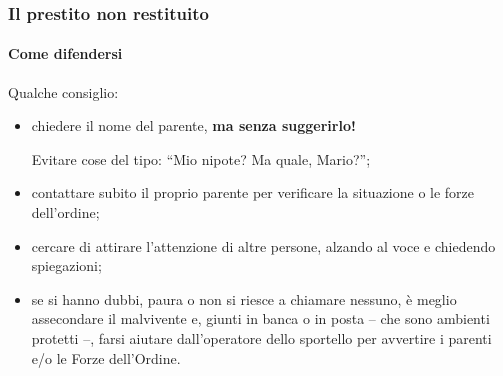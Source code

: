 \documentclass[11pt]{beamer}
\begin{document}
	\begin{frame}
		\frametitle{Il prestito non restituito}
		\framesubtitle{Come difendersi}
		Qualche consiglio:
		\begin{itemize}
			\item chiedere il nome del parente, \textbf{ma senza suggerirlo!}
			
			Evitare cose del tipo: ``Mio nipote? Ma quale, Mario?'';
			\item contattare subito il proprio parente per verificare la situazione o le forze dell'ordine;
			\item cercare di attirare l'attenzione di altre persone, alzando al voce e chiedendo spiegazioni;
			\item se si hanno dubbi, paura o non si riesce a chiamare nessuno, è meglio assecondare il malvivente e, giunti in banca o in posta -- che sono ambienti protetti --, farsi aiutare dall'operatore dello sportello per avvertire i parenti e/o le Forze dell'Ordine.
		\end{itemize}
	\end{frame}
	
\end{document}
